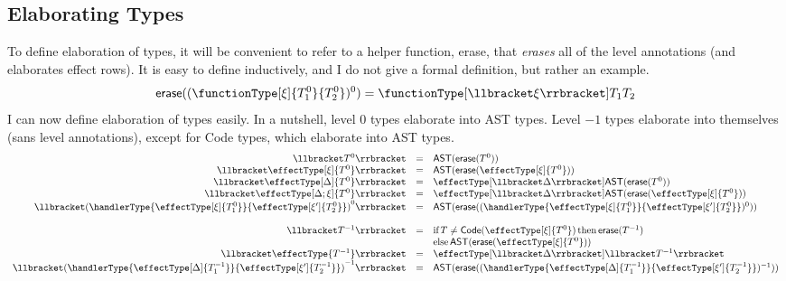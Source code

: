 \subsection{Elaborating Types}
To define elaboration of types, it will be convenient to refer to a helper function, \textsf{erase}, that \textit{erases} all of the level annotations (and elaborates effect rows). It is easy to define inductively, and I do not give a formal definition, but rather an example. 
\[\textsf{erase}((\functionType[\xi]{T_1^0}{T_2^0})^0) = \functionType[\elaborate{\xi}]{T_1}{T_2}\]
I can now define elaboration of types easily. In a nutshell, level $0$ types elaborate into \textsf{AST} types. Level $-1$ types elaborate into themselves (sans level annotations), except for \textsf{Code} types, which elaborate into \textsf{AST} types.
\[
\begin{array}{rcl}
  \elaborate{T^0} & = & \AST{\erase{T^0}}\\
  \elaborate{\effectType[\xi]{T^0}} & = & \AST{\erase{\effectType[\xi]{T^0}}}\\
  \elaborate{\effectType[\Delta]{T^0}} & = & \effectType[\elaborate{\Delta}]{\AST{\erase{T^0}}}\\
  \elaborate{\effectType[\Delta ; \xi]{T^0}} & = & \effectType[\elaborate{\Delta}]{\AST{\erase{\effectType[\xi]{T^0}}}}\\
  \elaborate{{(\handlerType{\effectType[\xi]{T_1^0}}{\effectType[\xi']{T_2^0}})}^0} & = & {\AST{\erase{(\handlerType{\effectType[\xi]{T_1^0}}{\effectType[\xi']{T_2^0}})^0}}}\\\\
  \elaborate{T^{-1}} & = & \text{if} \, T \neq \Code{\effectType[\xi]{T^0}} \, \text{then} \, \erase{T^{-1}} \\ && \text{else}\, \AST{\erase{\effectType[\xi]{T^0}}}\\
  \elaborate{\effectType{T^{-1}}} & = & \effectType[\elaborate{\Delta}]{\elaborate{T^{-1}}}\\
  \elaborate{{(\handlerType{\effectType[\Delta]{T_1^{-1}}}{\effectType[\xi']{T_2^{-1}}})}^{-1}} & = & {\AST{\erase{(\handlerType{\effectType[\Delta]{T_1^{-1}}}{\effectType[\xi']{T_2^{-1}}})^{-1}}}}
\end{array}
\]
